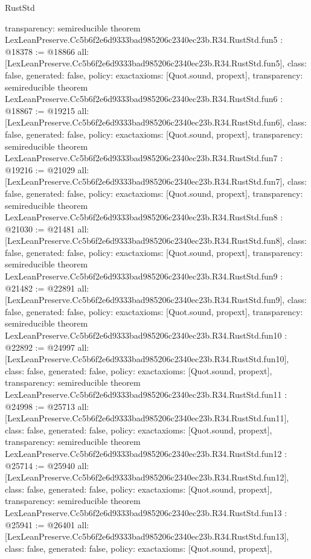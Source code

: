 \begin{lexlean}{RustStd}
\begin{coremodule}
{  transparency: semireducible
}
theorem LexLeanPreserve.Cc5b6f2e6d9333bad985206c2340ec23b.R34.RustStd.fun5 : @18378 := @18866 {
  all: [LexLeanPreserve.Cc5b6f2e6d9333bad985206c2340ec23b.R34.RustStd.fun5],
  class: false,
  generated: false,
  policy: exact{axioms: [Quot.sound, propext]},
  transparency: semireducible
}
theorem LexLeanPreserve.Cc5b6f2e6d9333bad985206c2340ec23b.R34.RustStd.fun6 : @18867 := @19215 {
  all: [LexLeanPreserve.Cc5b6f2e6d9333bad985206c2340ec23b.R34.RustStd.fun6],
  class: false,
  generated: false,
  policy: exact{axioms: [Quot.sound, propext]},
  transparency: semireducible
}
theorem LexLeanPreserve.Cc5b6f2e6d9333bad985206c2340ec23b.R34.RustStd.fun7 : @19216 := @21029 {
  all: [LexLeanPreserve.Cc5b6f2e6d9333bad985206c2340ec23b.R34.RustStd.fun7],
  class: false,
  generated: false,
  policy: exact{axioms: [Quot.sound, propext]},
  transparency: semireducible
}
theorem LexLeanPreserve.Cc5b6f2e6d9333bad985206c2340ec23b.R34.RustStd.fun8 : @21030 := @21481 {
  all: [LexLeanPreserve.Cc5b6f2e6d9333bad985206c2340ec23b.R34.RustStd.fun8],
  class: false,
  generated: false,
  policy: exact{axioms: [Quot.sound, propext]},
  transparency: semireducible
}
theorem LexLeanPreserve.Cc5b6f2e6d9333bad985206c2340ec23b.R34.RustStd.fun9 : @21482 := @22891 {
  all: [LexLeanPreserve.Cc5b6f2e6d9333bad985206c2340ec23b.R34.RustStd.fun9],
  class: false,
  generated: false,
  policy: exact{axioms: [Quot.sound, propext]},
  transparency: semireducible
}
theorem LexLeanPreserve.Cc5b6f2e6d9333bad985206c2340ec23b.R34.RustStd.fun10 : @22892 := @24997 {
  all: [LexLeanPreserve.Cc5b6f2e6d9333bad985206c2340ec23b.R34.RustStd.fun10],
  class: false,
  generated: false,
  policy: exact{axioms: [Quot.sound, propext]},
  transparency: semireducible
}
theorem LexLeanPreserve.Cc5b6f2e6d9333bad985206c2340ec23b.R34.RustStd.fun11 : @24998 := @25713 {
  all: [LexLeanPreserve.Cc5b6f2e6d9333bad985206c2340ec23b.R34.RustStd.fun11],
  class: false,
  generated: false,
  policy: exact{axioms: [Quot.sound, propext]},
  transparency: semireducible
}
theorem LexLeanPreserve.Cc5b6f2e6d9333bad985206c2340ec23b.R34.RustStd.fun12 : @25714 := @25940 {
  all: [LexLeanPreserve.Cc5b6f2e6d9333bad985206c2340ec23b.R34.RustStd.fun12],
  class: false,
  generated: false,
  policy: exact{axioms: [Quot.sound, propext]},
  transparency: semireducible
}
theorem LexLeanPreserve.Cc5b6f2e6d9333bad985206c2340ec23b.R34.RustStd.fun13 : @25941 := @26401 {
  all: [LexLeanPreserve.Cc5b6f2e6d9333bad985206c2340ec23b.R34.RustStd.fun13],
  class: false,
  generated: false,
  policy: exact{axioms: [Quot.sound, propext]},
}
\end{coremodule}
\end{lexlean}
